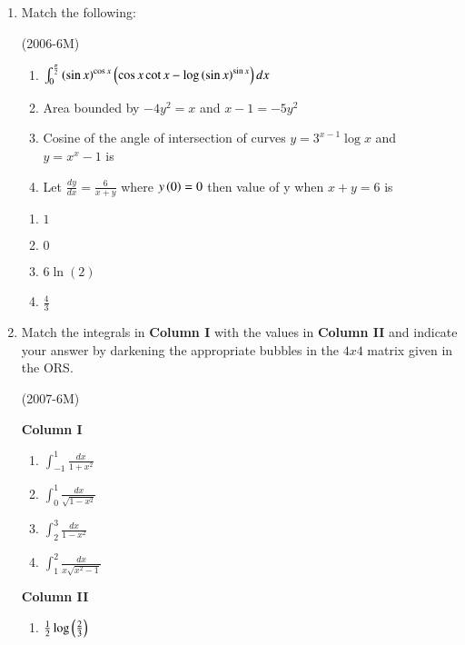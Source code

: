 \documentclass[journal,12pt,twocolumn]{IEEEtran}
\theoremstyle{remark}
\begin{document}
	\begin{enumerate}
		\item Match the following:

			\hfill{(2006-6M)}
			\begin{multicols}{2}
				\begin{enumerate}
				\item	$\int_{0}^{\frac{\pi}{2}} \left({\sin x}\right)^{\cos x} \left(\cos x\cot x-\log\left(\sin x\right)^{\sin x}\right) dx $
				\item Area bounded by $-4y^{2}=x$ and $x-1=-5y^{2}$
				\item Cosine of the angle of intersection of curves $y=3^{x-1}\log x$ and $y=x^{x}-1$ is
				\item Let $\frac{dy}{dx}=\frac{6}{x+y}$ where $y\left(0\right)=0$ then value of y when $x+y=6$ is
				\end{enumerate}
			\columnbreak
				\begin{enumerate}
					\item $1$
						
					\item $0$

					\item $6\ln(2)$

					\item $\frac{4}{3}$
						
				\end{enumerate}
				\end{multicols}
			\item Match the integrals in \textbf{Column I} with the values in \textbf{Column II} and indicate your answer by darkening the appropriate bubbles in the $4x4$ matrix given in the ORS. 

			\hfill{(2007-6M)}
			\begin{multicols}{2}
				\textbf{Column I}

				\begin{enumerate}
					\item $\int_{-1}^{1}\frac{dx}{1+x^{2}}$
					\item $\int_{0}^{1}\frac{dx}{\sqrt{1-x^{2}}}$
					\item $\int_{2}^{3}\frac{dx}{1-x^{2}}$
					\item $\int_{1}^{2}\frac{dx}{x\sqrt{x^{2}-1}}$
				\end{enumerate}
			\columnbreak
				\textbf{Column II}
				\begin{enumerate}
					\item $\frac{1}{2}\log\left(\frac{2}{3}\right)$


\end{enumerate}
\end{multicols}
\end{enumerate}
\end{document}
